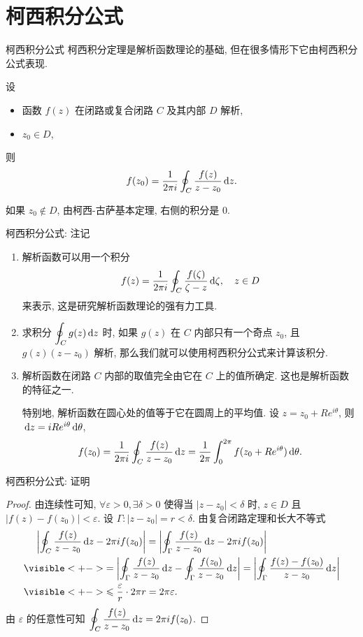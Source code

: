 \section{柯西积分公式}


\begin{frame}{柯西积分公式}
\onslide<+->
柯西积分定理是解析函数理论的基础, 但在很多情形下它由柯西积分公式表现.
\begin{conclusion}[柯西积分公式]
设
\begin{itemize}[<*>]
\item 函数 $f(z)$ 在闭路或复合闭路 $C$ 及其内部 $D$ 解析,
\item $z_0\in D$,
\end{itemize}
\onslide<+->
则
\[f(z_0)=\frac1{2\pi i}\oint_C\frac{f(z)}{z-z_0}\,\mathrm{d} z.\]
\end{conclusion}
\onslide<+->
如果 $z_0\notin D$, 由柯西-古萨基本定理, 右侧的积分是 $0$.
\end{frame}


\begin{frame}{柯西积分公式: 注记}
\begin{enumerate}
\item 解析函数可以用一个积分
\[f(z)=\frac1{2\pi i}\oint_C\frac{f(\zeta)}{\zeta-z}\,\mathrm{d}\zeta,\quad z\in D\]
来表示, 这是研究解析函数理论的强有力工具.
\item 求积分 $\displaystyle\oint_C g(z)\,\mathrm{d} z$ 时, 如果 $g(z)$ 在 $C$ 内部只有一个奇点 $z_0$, 且 $g(z)(z-z_0)$ 解析, 那么我们就可以使用柯西积分公式来计算该积分.
\item 解析函数在闭路 $C$ 内部的取值完全由它在 $C$ 上的值所确定. 这也是解析函数的特征之一.

\onslide<+->
\indent
特别地, 解析函数在圆心处的值等于它在圆周上的平均值.
\onslide<+->
设 $z=z_0+Re^{i\theta}$, 则 $\,\mathrm{d} z=iRe^{i\theta}\,\mathrm{d}\theta$,
\onslide<+->
\[f(z_0)=\frac1{2\pi i}\oint_C\frac{f(z)}{z-z_0}\,\mathrm{d} z=\frac1{2\pi}\int_0^{2\pi}f(z_0+Re^{i\theta})\,\mathrm{d}\theta.\]
\end{enumerate}
\end{frame}


\begin{frame}{柯西积分公式: 证明}
\begin{proof}
由连续性可知, $\forall\varepsilon>0,\exists\delta>0$ 使得当 $|z-z_0|<\delta$ 时, $z\in D$ 且 $|f(z)-f(z_0)|<\varepsilon$.
\onslide<+->
设 $\Gamma:|z-z_0|=r<\delta$.
\onslide<+->
由复合闭路定理和长大不等式
\begin{align*}
&\peq\abs{\oint_C\frac{f(z)}{z-z_0}\diff z-2\pi i f(z_0)}
=\abs{\oint_\Gamma\frac{f(z)}{z-z_0}\diff z-2\pi i f(z_0)}\\
&\visible<+->{=\abs{\oint_\Gamma\frac{f(z)}{z-z_0}\diff z-\oint_\Gamma\frac{f(z_0)}{z-z_0}\diff z}
=\abs{\oint_\Gamma\frac{f(z)-f(z_0)}{z-z_0}\diff z}}\\
&\visible<+->{\le \frac\varepsilon r\cdot 2\pi r=2\pi \varepsilon.}
\end{align*}
\onslide<+->
由 $\varepsilon$ 的任意性可知 $\displaystyle\oint_C\frac{f(z)}{z-z_0}\,\mathrm{d} z=2\pi i f(z_0)$.
\end{proof}
\end{frame}


